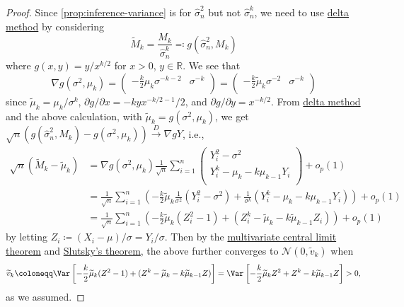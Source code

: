 \begin{proof}
	Since \autoref{prop:inference-variance} is for \(\hat{\sigma} _n^2\) but not \(\hat{\sigma} _n^k\), we need to use \hyperref[thm:delta-method]{delta method} by considering
	\[
		\widetilde{M} _k
		= \frac{M_k}{\hat{\sigma} _n^k}
		\eqqcolon g(\hat{\sigma} _n^2, M_k)
	\]
	where \(g(x, y) = y / x^{k / 2}\) for \(x > 0\), \(y \in \mathbb{R} \). We see that
	\[
		\nabla g(\sigma ^2, \mu _k)
		= \begin{pmatrix}
			-\frac{k}{2} \mu _k \sigma ^{-k - 2} & \sigma ^{-k} \\
		\end{pmatrix}
		= \begin{pmatrix}
			-\frac{k}{2} \widetilde{\mu} _k \sigma ^{-2} & \sigma ^{-k} \\
		\end{pmatrix}
	\]
	since \(\widetilde{\mu} _k = \mu _k / \sigma ^k\), \(\partial g / \partial x = - k y x^{-k / 2 - 1} / 2\), and  \(\partial g / \partial y = x^{-k / 2}\). From \hyperref[thm:delta-method]{delta method} and the above calculation, with \(\widetilde{\mu} _k = g(\sigma ^2, \mu _k)\), we get \(\sqrt{n} (g(\hat{\sigma} _n^2, M_k) - g(\sigma ^2, \mu _k)) \overset{D}{\to } \nabla g Y\), i.e.,
	\[
		\begin{split}
			\sqrt{n} (\widetilde{M} _k - \widetilde{\mu} _k)
			 & = \nabla g(\sigma ^2, \mu _k) \frac{1}{\sqrt{n} } \sum_{i=1}^{n} \begin{pmatrix}
				                                                                    Y_i^2 - \sigma ^2                 \\
				                                                                    Y_i^k - \mu _k - k \mu _{k-1} Y_i \\
			                                                                    \end{pmatrix} + o_p(1)                                                                                             \\
			 & = \frac{1}{\sqrt{n} } \sum_{i=1}^{n} \left( -\frac{k}{2} \widetilde{\mu} _k \frac{1}{\sigma ^2} (Y_i^2 - \sigma ^2) + \frac{1}{\sigma ^k} (Y_i^k - \mu _k - k \mu _{k-1} Y_i) \right) + o_p(1) \\
			 & = \frac{1}{\sqrt{n} } \sum_{i=1}^{n} \left( -\frac{k}{2} \widetilde{\mu} _k (Z_i^2 - 1) + (Z_i^k - \widetilde{\mu} _k - k \widetilde{\mu} _{k-1} Z_i ) \right) + o_p(1)
		\end{split}
	\]
	by letting \(Z_i \coloneqq (X_i - \mu) / \sigma = Y_i / \sigma \). Then by the \hyperref[thm:multivariate-CLT]{multivariate central limit theorem} and \hyperref[col:Slutsky]{Slutsky's theorem}, the above further converges to \(\mathcal{N} (0, \widetilde{v} _k)\) when
	\[
		\widetilde{v} _k
		\coloneqq \Var_{}\left[-\frac{k}{2} \widetilde{\mu} _k (Z^2 - 1) + (Z^k - \widetilde{\mu} _k - k \widetilde{\mu} _{k-1} Z ) \right]
		= \Var_{}\left[-\frac{k}{2} \widetilde{\mu} _k Z^2 + Z^k - k \widetilde{\mu} _{k-1} Z \right] > 0,
	\]
	as we assumed.
\end{proof}

